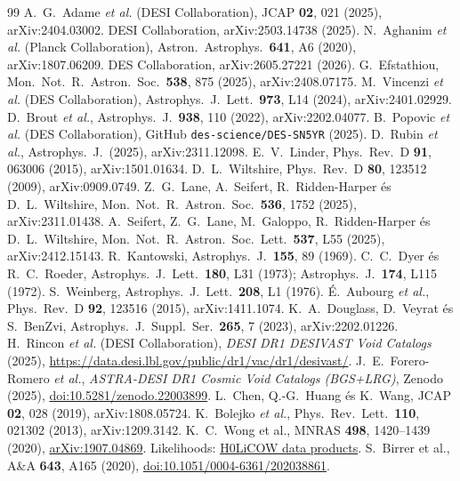 \documentclass[11pt,a4paper]{article}
\begin{document}
\begin{thebibliography}{99}
 A.~G.~Adame \textit{et al.} (DESI Collaboration), JCAP \textbf{02}, 021 (2025), arXiv:2404.03002.
 DESI Collaboration, arXiv:2503.14738 (2025).
 N.~Aghanim \textit{et al.} (Planck Collaboration), Astron.\ Astrophys.\ \textbf{641}, A6 (2020), arXiv:1807.06209.
 DES Collaboration, arXiv:2605.27221 (2026).
 G.~Efstathiou, Mon.\ Not.\ R.\ Astron.\ Soc.\ \textbf{538}, 875 (2025), arXiv:2408.07175.
 M.~Vincenzi \textit{et al.} (DES Collaboration), Astrophys.\ J.\ Lett.\ \textbf{973}, L14 (2024), arXiv:2401.02929.
 D.~Brout \textit{et al.}, Astrophys.\ J.\ \textbf{938}, 110 (2022), arXiv:2202.04077.
 B.~Popovic \textit{et al.} (DES Collaboration), GitHub \texttt{des-science/DES-SN5YR} (2025).
 D.~Rubin \textit{et al.}, Astrophys.\ J.\ (2025), arXiv:2311.12098.
 E.~V.~Linder, Phys.\ Rev.\ D \textbf{91}, 063006 (2015), arXiv:1501.01634.
 D.~L.~Wiltshire, Phys.\ Rev.\ D \textbf{80}, 123512 (2009), arXiv:0909.0749.
 Z.~G.~Lane, A.~Seifert, R.~Ridden-Harper \'es D.~L.~Wiltshire, Mon.\ Not.\ R.\ Astron.\ Soc.\ \textbf{536}, 1752 (2025), arXiv:2311.01438.
 A.~Seifert, Z.~G.~Lane, M.~Galoppo, R.~Ridden-Harper \'es D.~L.~Wiltshire, Mon.\ Not.\ R.\ Astron.\ Soc.\ Lett.\ \textbf{537}, L55 (2025), arXiv:2412.15143.
 R.~Kantowski, Astrophys.\ J.\ \textbf{155}, 89 (1969).
 C.~C.~Dyer \'es R.~C.~Roeder, Astrophys.\ J.\ Lett.\ \textbf{180}, L31 (1973); Astrophys.\ J.\ \textbf{174}, L115 (1972).
 S.~Weinberg, Astrophys.\ J.\ Lett.\ \textbf{208}, L1 (1976).
 \'E.~Aubourg \textit{et al.}, Phys.\ Rev.\ D \textbf{92}, 123516 (2015), arXiv:1411.1074.
 K.~A.~Douglass, D.~Veyrat \'es S.~BenZvi, Astrophys.\ J.\ Suppl.\ Ser.\ \textbf{265}, 7 (2023), arXiv:2202.01226.
 H.~Rincon \textit{et al.} (DESI Collaboration), \textit{DESI DR1 DESIVAST Void Catalogs} (2025), \url{https://data.desi.lbl.gov/public/dr1/vac/dr1/desivast/}.
 J.~E.~Forero-Romero \textit{et al.}, \textit{ASTRA-DESI DR1 Cosmic Void Catalogs (BGS+LRG)}, Zenodo (2025), \href{https://doi.org/10.5281/zenodo.22003899}{doi:10.5281/zenodo.22003899}.
 L.~Chen, Q.-G.~Huang \'es K.~Wang, JCAP \textbf{02}, 028 (2019), arXiv:1808.05724.
 K.~Bolejko \textit{et al.}, Phys.\ Rev.\ Lett.\ \textbf{110}, 021302 (2013), arXiv:1209.3142.
 K.~C.~Wong et al., MNRAS \textbf{498}, 1420--1439 (2020),
 \href{https://arxiv.org/abs/1907.04869}{arXiv:1907.04869}.
 Likelihoods: \href{https://shsuyu.github.io/H0LiCOW/site/h0licow_data.html}{H0LiCOW data products}.
 S.~Birrer et al., A\&A \textbf{643}, A165 (2020),
 \href{https://doi.org/10.1051/0004-6361/202038861}{doi:10.1051/0004-6361/202038861}.
\end{thebibliography}
\end{document}
